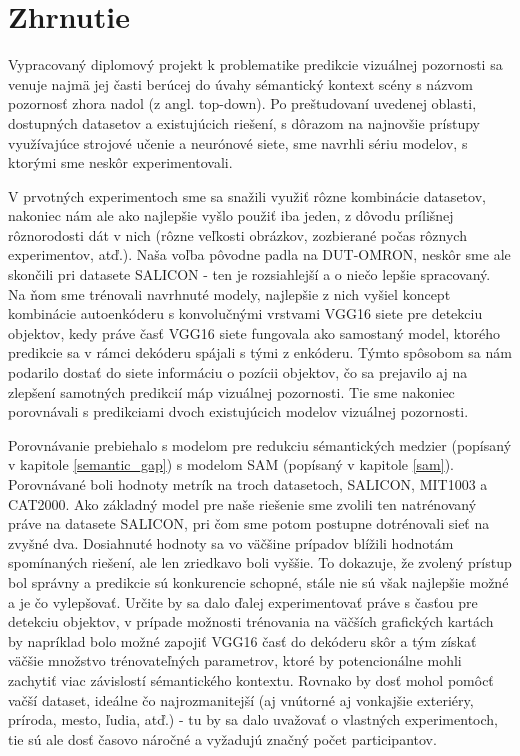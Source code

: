 
\newpage
\section{Zhrnutie}

Vypracovaný diplomový projekt k problematike predikcie vizuálnej pozornosti sa venuje najmä jej časti berúcej do úvahy sémantický kontext scény s názvom pozornosť zhora nadol (z angl. top-down). Po preštudovaní uvedenej oblasti, dostupných datasetov  a existujúcich riešení, s dôrazom na najnovšie prístupy využívajúce strojové učenie a neurónové siete, sme navrhli sériu modelov, s ktorými sme neskôr experimentovali.

V prvotných experimentoch sme sa snažili využiť rôzne kombinácie datasetov, nakoniec nám ale ako najlepšie vyšlo použiť iba jeden, z dôvodu prílišnej rôznorodosti dát v nich (rôzne veľkosti obrázkov, zozbierané počas rôznych experimentov, atď.). Naša voľba pôvodne padla na DUT-OMRON, neskôr sme ale skončili pri datasete SALICON - ten je rozsiahlejší a o niečo lepšie spracovaný. Na ňom sme trénovali navrhnuté modely, najlepšie z nich vyšiel koncept kombinácie autoenkóderu s konvolučnými vrstvami VGG16 siete pre detekciu objektov, kedy práve časť VGG16 siete fungovala ako samostaný model, ktorého predikcie sa v rámci dekóderu spájali s tými z enkóderu. Týmto spôsobom sa nám podarilo dostať do siete informáciu o pozícii objektov, čo sa prejavilo aj na zlepšení samotných predikcií máp vizuálnej pozornosti. Tie sme nakoniec porovnávali s predikciami dvoch existujúcich modelov vizuálnej pozornosti.

Porovnávanie prebiehalo s modelom pre redukciu sémantických medzier (popísaný v kapitole \ref{semantic_gap}) s modelom SAM (popísaný v kapitole \ref{sam}). Porovnávané boli hodnoty metrík na troch datasetoch, SALICON, MIT1003 a CAT2000. Ako základný model pre naše riešenie sme zvolili ten natrénovaný práve na datasete SALICON, pri čom sme potom postupne dotrénovali sieť na zvyšné dva. Dosiahnuté hodnoty sa vo väčšine prípadov blížili hodnotám spomínaných riešení, ale len zriedkavo boli vyššie. To dokazuje, že zvolený prístup bol správny a predikcie sú konkurencie schopné, stále nie sú však najlepšie možné a je čo vylepšovať. Určite by sa dalo ďalej experimentovať práve s časťou pre detekciu objektov, v prípade možnosti trénovania na väčších grafických kartách by napríklad bolo možné zapojiť VGG16 časť do dekóderu skôr a tým získať väčšie množstvo trénovateľných parametrov, ktoré by potencionálne mohli zachytiť viac závislostí sémantického kontextu. Rovnako by dosť mohol pomôcť vačší dataset, ideálne čo najrozmanitejší (aj vnútorné aj vonkajšie exteriéry, príroda, mesto, ľudia, atď.) - tu by sa dalo uvažovať o vlastných experimentoch, tie sú ale dosť časovo náročné a vyžadujú značný počet participantov.
